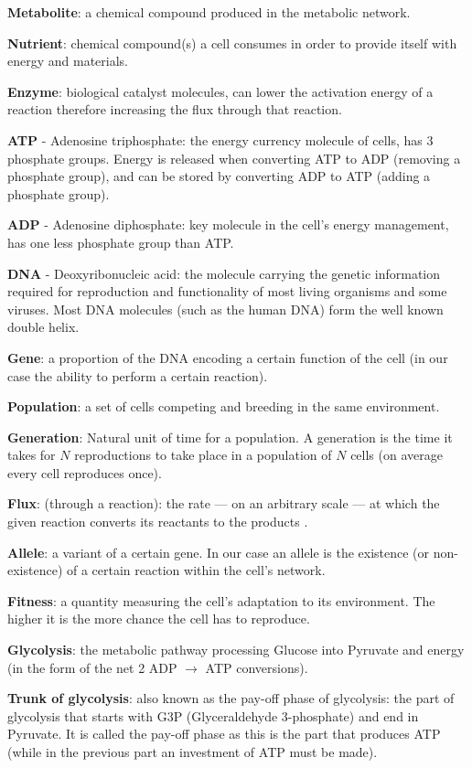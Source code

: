 \documentclass[a4paper,12pt]{article}
\begin{document}
	\begin{framed}

		\textbf{Metabolite}: a chemical compound produced in the metabolic network. 

		\textbf{Nutrient}: chemical compound(s) a cell consumes in order to provide itself with energy and materials.

		\textbf{Enzyme}: biological catalyst molecules, can lower the activation energy of a reaction therefore increasing the flux through that reaction. 

	\textbf{ATP} - Adenosine triphosphate: the energy currency molecule of cells, has 3 phosphate groups. Energy is released when converting ATP to ADP (removing a phosphate group), and can be stored by converting ADP to ATP (adding a phosphate group).

	\textbf{ADP} - Adenosine diphosphate: key molecule in the cell's energy management, has one less phosphate group than ATP.

	\textbf{DNA} - Deoxyribonucleic acid: the molecule carrying the genetic information required for reproduction and functionality of most living organisms and some viruses. Most DNA molecules (such as the human DNA) form the well known double helix. 

	\textbf{Gene}: a proportion of the DNA encoding a certain function of the cell (in our case the ability to perform a certain reaction). 

	\textbf{Population}: a set of cells competing and breeding in the same environment.

	\textbf{Generation}: Natural unit of time for a population. A generation is the time it takes for $N$ reproductions to take place in a population of $N$ cells (on average every cell reproduces once).

	\textbf{Flux}: (through a reaction): the rate ---  on an arbitrary scale --- at which the given reaction converts its reactants to the products . 

	\textbf{Allele}: a variant of a certain gene. In our case an allele is the existence (or non-existence) of a certain reaction within the cell's network.

	\textbf{Fitness}: a quantity measuring the cell's adaptation to its environment. The higher it is the more chance the cell has to reproduce.

	\textbf{Glycolysis}: the metabolic pathway processing Glucose into Pyruvate and energy (in the form of the net 2 ADP $\rightarrow$ ATP conversions).

	\textbf{Trunk of glycolysis}: also known as the pay-off phase of glycolysis: the part of glycolysis that starts with G3P (Glyceraldehyde 3-phosphate) and end in Pyruvate. It is called the pay-off phase as this is the part that produces ATP (while in the previous part an investment of ATP must be made).

	\end{framed}
\end{document}
